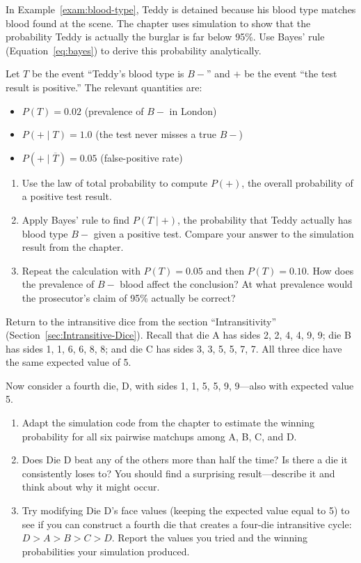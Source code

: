 \begin{exercise}
In Example~\ref{exam:blood-type}, Teddy is detained because his blood type
matches blood found at the scene. The chapter uses simulation to show that
the probability Teddy is actually the burglar is far below 95\%.
Use Bayes' rule (Equation~\ref{eq:bayes}) to derive this probability
analytically.

Let $T$ be the event ``Teddy's blood type is $B-$'' and $+$ be the event
``the test result is positive.'' The relevant quantities are:
\begin{itemize}
  \item $P(T) = 0.02$ (prevalence of $B-$ in London)
  \item $P(+ \mid T) = 1.0$ (the test never misses a true $B-$)
  \item $P(+ \mid \overline{T}) = 0.05$ (false-positive rate)
\end{itemize}
\begin{enumerate}
  \item Use the law of total probability to compute $P(+)$, the overall
    probability of a positive test result.
  \item Apply Bayes' rule to find $P(T \mid +)$, the probability that
    Teddy actually has blood type $B-$ given a positive test. Compare
    your answer to the simulation result from the chapter.
  \item Repeat the calculation with $P(T) = 0.05$ and then $P(T) = 0.10$.
    How does the prevalence of $B-$ blood affect the conclusion?
    At what prevalence would the prosecutor's claim of 95\% actually be
    correct?
\end{enumerate}
\end{exercise}

\begin{exercise}
Return to the intransitive dice from the section
``Intransitivity'' (Section~\ref{sec:Intransitive-Dice}).
Recall that die A has sides 2, 2, 4, 4, 9, 9; die B has sides
1, 1, 6, 6, 8, 8; and die C has sides 3, 3, 5, 5, 7, 7.
All three dice have the same expected value of 5.

Now consider a fourth die, D, with sides 1, 1, 5, 5, 9, 9---also
with expected value 5.
\begin{enumerate}
  \item Adapt the simulation code from the chapter to estimate the winning
    probability for all six pairwise matchups among A, B, C, and D.
  \item Does Die D beat any of the others more than half the time?
    Is there a die it consistently loses to? You should find a
    surprising result---describe it and think about why it might occur.
  \item Try modifying Die D's face values (keeping the expected value
    equal to 5) to see if you can construct a fourth die that creates a
    four-die intransitive cycle: $D > A > B > C > D$. Report the values
    you tried and the winning probabilities your simulation produced.
\end{enumerate}
\end{exercise}

